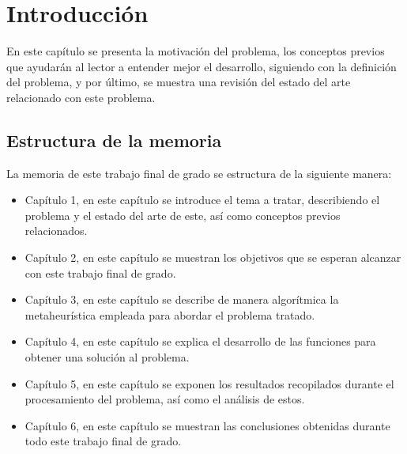 
\chapter{Introducción} %

\label{Chapter1}


\newcommand{\keyword}[1]{\textbf{#1}}
\newcommand{\tabhead}[1]{\textbf{#1}}
\newcommand{\code}[1]{\texttt{#1}}
\newcommand{\file}[1]{\texttt{\bfseries#1}}
\newcommand{\option}[1]{\texttt{\itshape#1}}
\newcommand{\Mod}[1]{\ (\mathrm{mod}\ #1)}

En este capítulo se presenta la motivación del problema, los conceptos previos que ayudarán al lector a entender mejor el desarrollo, siguiendo con la definición del problema, y por último, se muestra una revisión del estado del arte relacionado con este problema.

\section{Estructura de la memoria}
La memoria de este trabajo final de grado se estructura de la siguiente manera:
\begin{itemize}
	\item Capítulo 1, en este capítulo se introduce el tema a tratar, describiendo el problema y el estado del arte de este, así como conceptos previos relacionados.
	\item Capítulo 2, en este capítulo se muestran los objetivos que se esperan alcanzar con este trabajo final de grado.
	\item Capítulo 3, en este capítulo se describe de manera algorítmica la metaheurística empleada para abordar el problema tratado.
	\item Capítulo 4, en este capítulo se explica el desarrollo de las funciones para obtener una solución al problema.
	\item Capítulo 5, en este capítulo se exponen los resultados recopilados durante el procesamiento del problema, así como el análisis de estos.
	\item Capítulo 6, en este capítulo se muestran las conclusiones obtenidas durante todo este trabajo final de grado.
\end{itemize}

